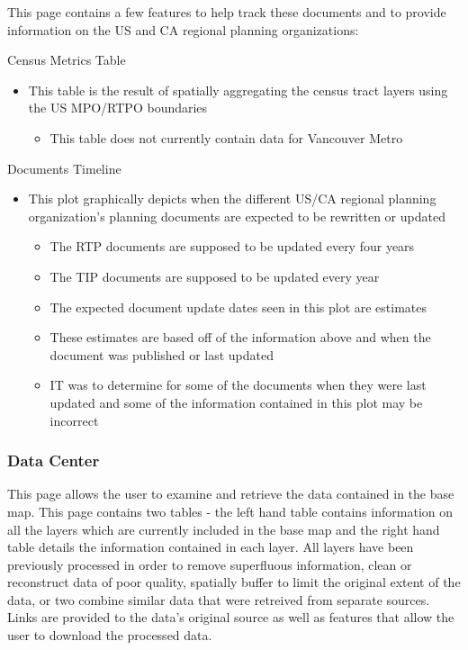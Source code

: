 \documentclass[
]{article}
\providecommand{\tightlist}{%
  \setlength{\itemsep}{0pt}\setlength{\parskip}{0pt}}
\begin{document}
This page contains a few features to help track these documents and to
provide information on the US and CA regional planning organizations:

Census Metrics Table

\begin{itemize}
\tightlist
\item
  This table is the result of spatially aggregating the census tract
  layers using the US MPO/RTPO boundaries

  \begin{itemize}
  \tightlist
  \item
    This table does not currently contain data for Vancouver Metro
  \end{itemize}
\end{itemize}

Documents Timeline

\begin{itemize}
\tightlist
\item
  This plot graphically depicts when the different US/CA regional
  planning organization's planning documents are expected to be
  rewritten or updated

  \begin{itemize}
  \tightlist
  \item
    The RTP documents are supposed to be updated every four years
  \item
    The TIP documents are supposed to be updated every year
  \item
    The expected document update dates seen in this plot are estimates
  \item
    These estimates are based off of the information above and when the
    document was published or last updated
  \item
    IT was to determine for some of the documents when they were last
    updated and some of the information contained in this plot may be
    incorrect
  \end{itemize}
\end{itemize}

\hypertarget{data-center}{%
\subsubsection{Data Center}\label{data-center}}

This page allows the user to examine and retrieve the data contained in
the base map. This page contains two tables - the left hand table
contains information on all the layers which are currently included in
the base map and the right hand table details the information contained
in each layer. All layers have been previously processed in order to
remove superfluous information, clean or reconstruct data of poor
quality, spatially buffer to limit the original extent of the data, or
two combine similar data that were retreived from separate sources.
Links are provided to the data's original source as well as features
that allow the user to download the processed data.
\end{document}
